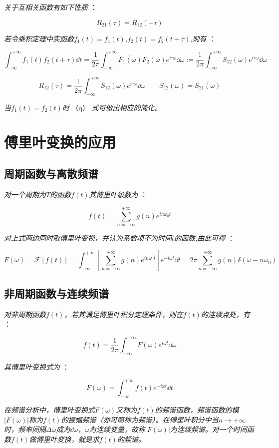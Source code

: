\textit{关于互相关函数有如下性质 }：

\[R_{21}(\tau)=R_{12}(-\tau)\]

\textit{若令乘积定理中实函数$f_1(t)=f_1(t)$,$f_2(t)=f_2(t+\tau)$,则有 }：

\[\int_{-\infty}^{+\infty}f_1(t)f_2(t+\tau)\dd{t}=\frac{1}{2\pi}\int_{-\infty}^{+\infty}\overline{F_1(\omega)}F_2(\omega)e^{i\tau \omega}\dd{\omega} :=\frac{1}{2\pi}\int_{-\infty}^{+\infty}S_{12}(\omega)e^{i\tau \omega}\dd{\omega}\]

\[R_{12}(\tau)=\frac{1}{2\pi}\int_{-\infty}^{+\infty}S_{12}(\omega)e^{i\tau \omega}\dd{\omega} \qquad S_{12}(\omega)=\overline{S_{21}(\omega)} \tag{q}\]

\textit{当$f_1(t)=f_2(t)$时} （q） \textit{式可做出相应的简化。}

\section{傅里叶变换的应用}

\subsection{周期函数与离散频谱}

\textit{对一个周期为$T$的函数$f(t)$其傅里叶级数为 }：

\[f(t)=\sum_{n=-\infty}^{+\infty}g(n)e^{in\omega_0 t} \]

\textit{对上式两边同时取傅里叶变换，并认为系数项不为时间$t$的函数,由此可得 }：

\[F(\omega)=\mathcal{F}[f(t)]=\int_{-\infty}^{+\infty}[\sum_{n=-\infty}^{+\infty}g(n)e^{in\omega_0 t}]e^{-i\omega t}\dd{t}=2\pi\sum_{n=-\infty}^{+\infty}g(n)\delta(\omega-n\omega_0) \tag{r}\]

\subsection{非周期函数与连续频谱}

\textit{对非周期函数$f(t)$，若其满足傅里叶积分定理条件，则在$f(t)$的连续点处，有 }：

\[f(t)=\frac{1}{2\pi}\int_{-\infty}^{+\infty}F(\omega)e^{i\omega t}\dd{\omega}\]

\textit{其傅里叶变换式为} ：

\[F(\omega)=\int_{-\infty}^{+\infty}f(t)e^{-i\omega t}\dd{t}\] 

\textit{在频谱分析中，傅里叶变换式$F(\omega)$又称为$f(t)$的频谱函数，频谱函数的模$|F(\omega)|$称为$f(t)$的振幅频谱（亦可简称为频谱）。在傅里叶积分中当$n\rightarrow +\infty$时，频率间隔$\Delta \omega $成为$\dd{\omega}$，$\omega$为连续变量，故称$|F(\omega)|$为连续频谱。对一个时间函数$f(t)$做傅里叶变换，就是求$f(t)$的频谱。}